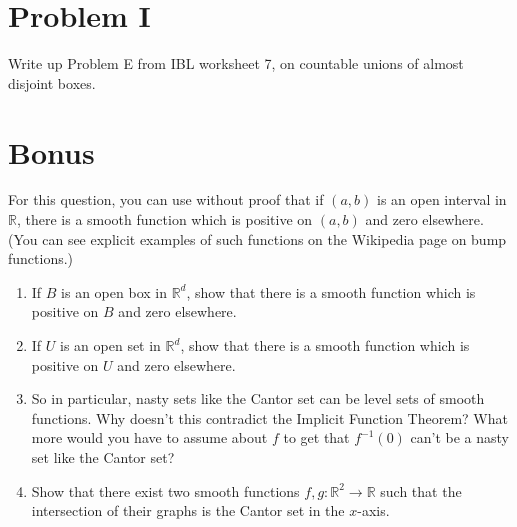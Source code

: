 \documentclass[lang=en,11pt]{template}
\begin{document}
\section*{Problem I}
Write up Problem E from IBL worksheet 7, on countable unions of almost disjoint boxes.

\section*{Bonus}
For this question, you can use without proof that if $(a, b)$ is an open interval in $\mathbb{R}$, there is a smooth function which is positive on $(a, b)$ and zero elsewhere. (You can see explicit examples of such functions on the Wikipedia page on bump functions.)
\begin{enumerate}
    \item If $B$ is an open box in $\mathbb{R}^d$, show that there is a smooth function which is positive on $B$ and zero elsewhere.
    \item If $U$ is an open set in $\mathbb{R}^d$, show that there is a smooth function which is positive on $U$ and zero elsewhere.
    \item So in particular, nasty sets like the Cantor set can be level sets of smooth functions. Why doesn’t this contradict the Implicit Function Theorem? What more would you have to assume about $f$ to get that $f^{-1}(0)$ can’t be a nasty set like the Cantor set?
    \item Show that there exist two smooth functions $f, g : \mathbb{R}^2 \to \mathbb{R}$ such that the intersection of their graphs is the Cantor set in the $x$-axis.
\end{enumerate}
\end{document}
